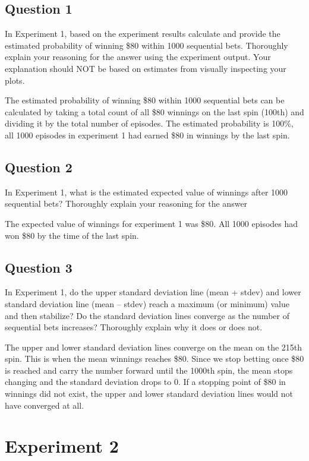 \documentclass[
	letterpaper, %
]{jdf}
\begin{document}
\subsection{Question 1}
In Experiment 1, based on the experiment results calculate and provide the estimated probability of winning \$80 within 1000 sequential bets. Thoroughly explain your reasoning for the answer using the experiment output. Your explanation should NOT be based on estimates from visually inspecting your plots. 

The estimated probability of winning \$80 within 1000 sequential bets can be calculated by taking a total count of all \$80 winnings on the last spin (100th) and dividing it by the total number of episodes. The estimated probability is 100\%, all 1000 episodes in experiment 1 had earned \$80 in winnings by the last spin.


\subsection{Question 2}
In Experiment 1, what is the estimated expected value of winnings after 1000 sequential bets? Thoroughly explain your reasoning for the answer

The expected value of winnings for experiment 1 was \$80.  All 1000 episodes had won \$80 by the time of the last spin.


\subsection{Question 3}
 In Experiment 1, do the upper standard deviation line (mean + stdev) and lower standard deviation line (mean – stdev) reach a maximum (or minimum) value and then stabilize? Do the standard deviation lines converge as the number of sequential bets increases? Thoroughly explain why it does or does not. 
 
 The upper and lower standard deviation lines converge on the mean on the 215th spin. This is when the mean winnings reaches \$80.  Since we stop betting once \$80 is reached and carry the number forward until the 1000th spin, the mean stops changing and the standard deviation drops to 0.  If a stopping point of \$80 in winnings did not exist, the upper and lower standard deviation lines would not have converged at all.


\section{Experiment 2}
\end{document}
